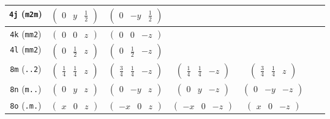 \documentclass[fleqn,9pt,landscape]{jsarticle}
\begin{document}
\begin{center}
\begin{longtable}{ccccccc}
{\tt 4j} ({\tt m2m}) & $ \begin{pmatrix} 0 & y & \frac{1}{2} \end{pmatrix} $ & $ \begin{pmatrix} 0 & - y & \frac{1}{2} \end{pmatrix} $ & $  $ & $  $ & $  $ & $  $ \\ \hline
{\tt 4k} ({\tt mm2}) & $ \begin{pmatrix} 0 & 0 & z \end{pmatrix} $ & $ \begin{pmatrix} 0 & 0 & - z \end{pmatrix} $ & $  $ & $  $ & $  $ & $  $ \\ \hline
{\tt 4l} ({\tt mm2}) & $ \begin{pmatrix} 0 & \frac{1}{2} & z \end{pmatrix} $ & $ \begin{pmatrix} 0 & \frac{1}{2} & - z \end{pmatrix} $ & $  $ & $  $ & $  $ & $  $ \\ \hline
{\tt 8m} ({\tt ..2}) & $ \begin{pmatrix} \frac{1}{4} & \frac{1}{4} & z \end{pmatrix} $ & $ \begin{pmatrix} \frac{3}{4} & \frac{1}{4} & - z \end{pmatrix} $ & $ \begin{pmatrix} \frac{1}{4} & \frac{1}{4} & - z \end{pmatrix} $ & $ \begin{pmatrix} \frac{3}{4} & \frac{1}{4} & z \end{pmatrix} $ & $  $ & $  $ \\ \hline
{\tt 8n} ({\tt m..}) & $ \begin{pmatrix} 0 & y & z \end{pmatrix} $ & $ \begin{pmatrix} 0 & - y & z \end{pmatrix} $ & $ \begin{pmatrix} 0 & y & - z \end{pmatrix} $ & $ \begin{pmatrix} 0 & - y & - z \end{pmatrix} $ & $  $ & $  $ \\ \hline
{\tt 8o} ({\tt .m.}) & $ \begin{pmatrix} x & 0 & z \end{pmatrix} $ & $ \begin{pmatrix} - x & 0 & z \end{pmatrix} $ & $ \begin{pmatrix} - x & 0 & - z \end{pmatrix} $ & $ \begin{pmatrix} x & 0 & - z \end{pmatrix} $ & $  $ & $  $ \\ \hline

\end{longtable}
\end{center}
\end{document}

